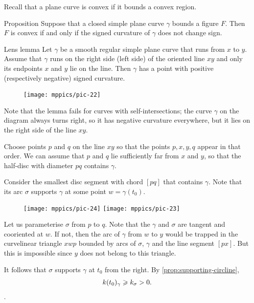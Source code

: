 Recall that a plane curve is convex if it bounds a convex region.

\begin{thm}{Proposition}\label{prop:convex}
Suppose that a closed simple plane curve $\gamma$ bounds a figure $F$.
Then $F$ is convex if and only if the signed curvature of $\gamma$ does not change sign.
\end{thm}


\begin{thm}{Lens lemma}\label{lem:lens}
Let $\gamma$ be a smooth regular simple plane curve that runs from $x$ to $y$.
Assume that $\gamma$ runs on the right side (left side) of the oriented line $xy$ and only its endpoints $x$ and $y$ lie on the line.
Then $\gamma$ has a point with positive (respectively negative) signed curvature.
\end{thm}

\begin{figure}
\vskip-4mm
\centering
\texttt{[image: mppics/pic-22]}
\vskip0mm
\end{figure}

Note that the lemma fails for curves with self-intersections;
the curve $\gamma$ on the diagram always turns right, 
so it has negative curvature everywhere, but it lies on the right side of the line $xy$.

Choose points $p$ and $q$ on the line $xy$
so that the points $p, x, y, q$ appear in that order.
We can assume that $p$ and $q$ lie sufficiently far from $x$ and $y$, so that the half-disc with diameter $pq$ contains $\gamma$.

Consider the smallest disc segment with chord $[pq]$ that contains $\gamma$.
Note that its arc $\sigma$ supports $\gamma$ at some point $w=\gamma(t_0)$.

\begin{figure}
\centering
\texttt{[image: mppics/pic-24]}
\bigskip
\texttt{[image: mppics/pic-23]}
\end{figure}

Let us parameterise $\sigma$ from $p$ to $q$.
Note that the $\gamma$ and $\sigma$ are tangent and cooriented at $w$.
If not, then the arc of $\gamma$ from $w$ to $y$ would be trapped in the curvelinear triangle $xwp$ bounded by arcs of $\sigma$, $\gamma$ and the line segment $[px]$.
But this is impossible since $y$ does not belong to this triangle.

It follows that $\sigma$ supports $\gamma$ at $t_0$ from the right.
By \ref{prop:supporting-circline}, 
\[k(t_0)_\gamma\geqslant k_\sigma >0.\].
\qeds

